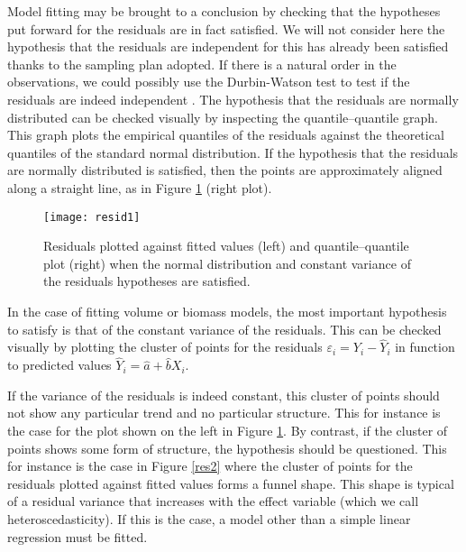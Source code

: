 Model fitting may be brought to a conclusion by checking that the hypotheses put forward for the residuals are in fact satisfied. We will not consider here the hypothesis that the residuals are independent for this has already been satisfied thanks to the sampling plan adopted. If there is a natural order in the observations, we could possibly use the Durbin-Watson test to test if the residuals are indeed independent \citep{durbin71}. The hypothesis that the residuals are normally distributed can be checked visually by inspecting the quantile--quantile graph. This graph plots the empirical quantiles of the residuals against the theoretical quantiles of the standard normal distribution. If the hypothesis that the residuals are normally distributed is satisfied, then the points are approximately aligned along a straight line, as in  Figure \ref{res1} (right plot).

\begin{figure}[htb]
\begin{center}
\texttt{[image: resid1]}
\end{center}
\caption[Residuals plotted against fitted values and quantile--quantile plot when the normal distribution and constant variance of the residuals hypotheses are satisfied.]{Residuals plotted against fitted values (left) and quantile--quantile plot (right) when the normal distribution and constant variance of the residuals hypotheses are satisfied.\label{res1}}
\end{figure}

In the case of fitting volume or biomass models, the most important hypothesis to satisfy is that of the constant variance of the residuals. This can be checked visually by plotting the cluster of points for the residuals $\varepsilon_i=Y_i-\hat{Y}_i$ in function to predicted values $\hat{Y}_i=\hat{a}+\hat{b}X_i$.

 If the variance of the residuals is indeed constant, this cluster of points should not show any particular trend and no particular structure. This for instance is the case for the plot shown on the left in  Figure \ref{res1}. By contrast, if the cluster of points shows some form of structure, the hypothesis should be questioned. This for instance is the case in  Figure \ref{res2} where the cluster of points for the residuals plotted against fitted values forms a funnel shape. This shape is typical of a residual variance that increases with the effect variable (which we call heteroscedasticity). If this is the case, a model other than a simple linear regression must be fitted.

